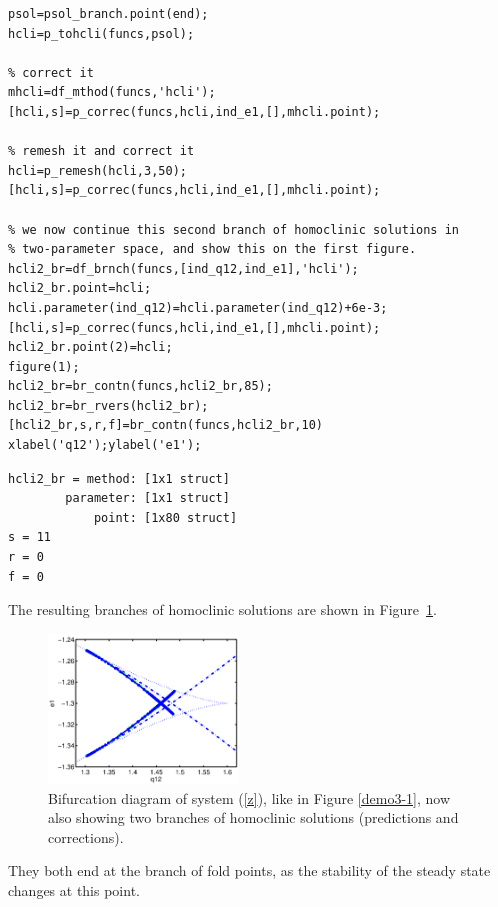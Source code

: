 \documentclass[10pt]{scrartcl}
\begin{document}
{\begin{lstlisting}
psol=psol_branch.point(end);
hcli=p_tohcli(funcs,psol);

% correct it
mhcli=df_mthod(funcs,'hcli');
[hcli,s]=p_correc(funcs,hcli,ind_e1,[],mhcli.point);

% remesh it and correct it
hcli=p_remesh(hcli,3,50);
[hcli,s]=p_correc(funcs,hcli,ind_e1,[],mhcli.point);

% we now continue this second branch of homoclinic solutions in
% two-parameter space, and show this on the first figure.
hcli2_br=df_brnch(funcs,[ind_q12,ind_e1],'hcli');
hcli2_br.point=hcli;
hcli.parameter(ind_q12)=hcli.parameter(ind_q12)+6e-3;
[hcli,s]=p_correc(funcs,hcli,ind_e1,[],mhcli.point);
hcli2_br.point(2)=hcli;
figure(1);
hcli2_br=br_contn(funcs,hcli2_br,85);
hcli2_br=br_rvers(hcli2_br);
[hcli2_br,s,r,f]=br_contn(funcs,hcli2_br,10)
xlabel('q12');ylabel('e1');  
\end{lstlisting}
{\small
\begin{verbatim}
hcli2_br = method: [1x1 struct]
        parameter: [1x1 struct]
            point: [1x80 struct]
s = 11
r = 0
f = 0
\end{verbatim}
}
The resulting branches of homoclinic solutions are shown in
Figure~\ref{demo3-1b}.
\begin{figure}[ht]
\begin{center}
\includegraphics[width=0.45\textwidth]{fig/hom_demfig01}
\caption{\label{demo3-1b}Bifurcation diagram of system (\ref{z}), like 
in Figure \ref{demo3-1}, now also showing two branches of homoclinic 
solutions (predictions and corrections).}
\end{center}
\end{figure}
They both end at the branch of fold points, as the stability of the 
steady state
changes at this point.  

}
\end{document}
